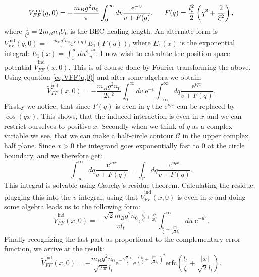 \begin{equation}
V_{FF}^\text{ind}(q,0) = -\frac{m_Bg^2n_0}{\pi}\int_{0}^\infty dv \frac{\text{e}^{-v}}{v+F(q)}, \hspace{0.5cm} F(q) = \frac{l_t^2}{2}\left(q^2+\frac{2}{\xi^2} \right),
\label{eq.VFF(q,0)}
\end{equation}
where $\frac{1}{\xi^2} = 2m_Bn_0U_0$ is the BEC healing length. An alternate form is $V_{FF}^\text{ind}(q,0) = -\frac{m_Bg^2n_0}{\pi} \text{e}^{F(q)} E_1(F(q))$, where $E_1(x)$ is the exponential integral: $E_1(x) = \int_1^\infty du \frac{\text{e}^{-xu}}{u}$. I now wish to calculate the position space potential $\tilde{V}_{FF}^\text{ind}(x,0)$. This is of course done by Fourier transforming the above. Using equation \eqref{eq.VFF(q,0)} and after some algebra we obtain:
\begin{equation}
\tilde{V}_{FF}^\text{ind}(x,0) = -\frac{m_Bg^2n_0}{2\pi^2}\int_0^\infty dv\;  \text{e}^{-v}\int_{-\infty}^\infty dq \frac{\text{e}^{iqx}}{v+F(q)}.
\end{equation}
Firstly we notice, that since $F(q)$ is even in $q$ the $\text{e}^{iqx}$ can be replaced by $\cos(qx)$. This shows, that the induced interaction is even in $x$ and we can restrict ourselves to positive $x$. Secondly when we think of $q$ as a complex variable we see, that  we can make a half-circle contour $\mathcal{C}$ in the upper complex half plane. Since $x>0$ the integrand goes exponentially fast to 0 at the circle boundary, and we therefore get:
\begin{equation}
\int_{-\infty}^\infty dq \frac{\text{e}^{iqx}}{v+F(q)} = \int_\mathcal{C} dq  \frac{\text{e}^{iqx}}{v+F(q)}. \nonumber
\end{equation}
This integral is solvable using Cauchy's residue theorem. Calculating the residue, plugging this into the $v$-integral, using that $\tilde{V}_{FF}^\text{ind}(x,0)$ is even in $x$ and doing some algebra leads us to the following form:
\begin{equation}
\tilde{V}_{FF}^\text{ind}(x,0) = -\frac{\sqrt{2}m_Bg^2n_0}{\pi l_t}\text{e}^{\frac{l_t^2}{\xi^2}+\frac{x^2}{2l_t^2}}\int_{\frac{l_t}{\xi}+\frac{|x|}{\sqrt{2}l_t}}^\infty du \; \text{e}^{-u^2}. \nonumber
\end{equation}
Finally recognizing the last part as proportional to the complementary error function, we arrive at the result:
\begin{equation}
\tilde{V}_{FF}^\text{ind}(x,0) = -\frac{m_Bg^2n_0}{\sqrt{2\pi} l_t} \text{e}^{-\frac{\sqrt{2}|x|}{\xi}}\text{e}^{\left(\frac{l_t}{\xi}+\frac{|x|}{\sqrt{2}l_t}\right)^2}\text{erfc}\left(\frac{l_t}{\xi}+\frac{|x|}{\sqrt{2}l_t}\right).
\end{equation}
